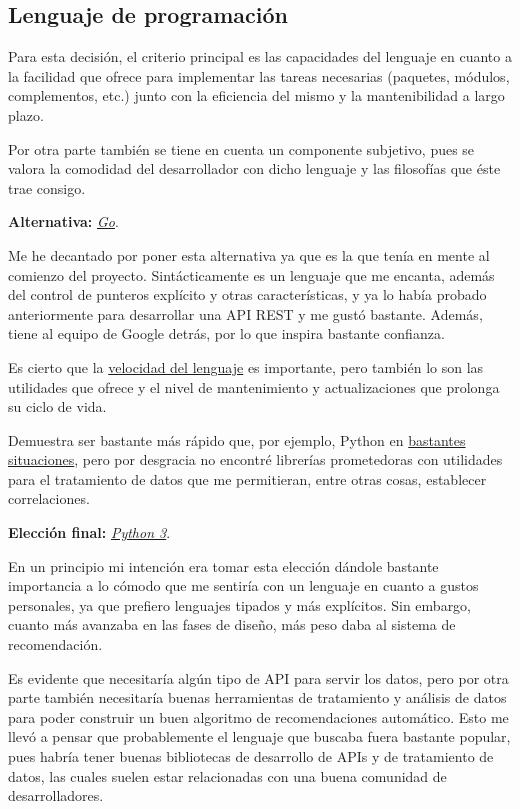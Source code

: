 \subsection{Lenguaje de programación}

Para esta decisión, el criterio principal es las capacidades del lenguaje en cuanto a la facilidad que ofrece para implementar las tareas necesarias (paquetes, módulos, complementos, etc.) junto con la eficiencia del mismo y la mantenibilidad a largo plazo.

Por otra parte también se tiene en cuenta un componente subjetivo, pues se valora la comodidad del desarrollador con dicho lenguaje y las filosofías que éste trae consigo.

\textbf{Alternativa:} \href{https://go.dev/}{\textit{Go}}.

Me he decantado por poner esta alternativa ya que es la que tenía en mente al comienzo del proyecto. Sintácticamente es un lenguaje que me encanta, además del control de punteros explícito y otras características, y ya lo había probado anteriormente para desarrollar una API REST y me gustó bastante. Además, tiene al equipo de Google detrás, por lo que inspira bastante confianza.

Es cierto que la \href{https://benchmarksgame-team.pages.debian.net/benchmarksgame/index.html}{velocidad del lenguaje} es importante, pero también lo son las utilidades que ofrece y el nivel de mantenimiento y actualizaciones que prolonga su ciclo de vida.

Demuestra ser bastante más rápido que, por ejemplo, Python en \href{https://benchmarksgame-team.pages.debian.net/benchmarksgame/fastest/go-python3.html}{bastantes situaciones}, pero por desgracia no encontré librerías prometedoras con utilidades para el tratamiento de datos que me permitieran, entre otras cosas, establecer correlaciones.

\textbf{Elección final:} \href{https://www.python.org/}{\textit{Python 3}}.

En un principio mi intención era tomar esta elección dándole bastante importancia a lo cómodo que me sentiría con un lenguaje en cuanto a gustos personales, ya que prefiero lenguajes tipados y más explícitos. Sin embargo, cuanto más avanzaba en las fases de diseño, más peso daba al sistema de recomendación. 

Es evidente que necesitaría algún tipo de API para servir los datos, pero por otra parte también necesitaría buenas herramientas de tratamiento y análisis de datos para poder construir un buen algoritmo de recomendaciones automático. Esto me llevó a pensar que probablemente el lenguaje que buscaba fuera bastante popular, pues habría tener buenas bibliotecas de desarrollo de APIs y de tratamiento de datos, las cuales suelen estar relacionadas con una buena comunidad de desarrolladores.

